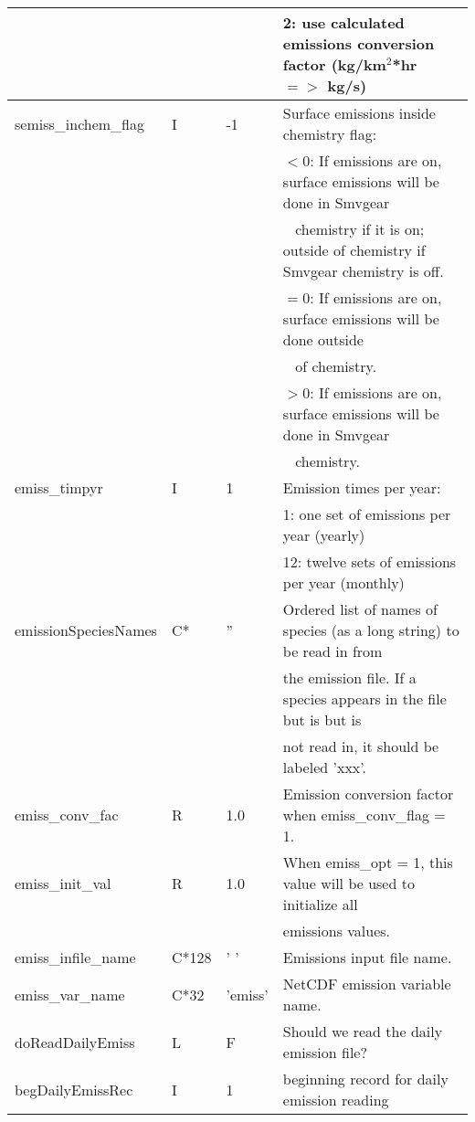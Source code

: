 {\begin{landscape}
\begin{center}
\begin{longtable}{|l|l|l|l|}
                  &   &   &         2:  use calculated emissions conversion factor (kg/km$^2$*hr $=>$ kg/s)  \\ \hline
semiss\_inchem\_flag
                & I & -1  & Surface emissions inside chemistry flag:  \\
                &   &   &   $<0$:  If emissions are on, surface emissions will be done in Smvgear \\
                  &   &   & \mbox{      } chemistry if it is on; outside of chemistry if Smvgear chemistry is off.  \\
                &   &   &   $=0$:  If emissions are on, surface emissions will be done outside \\ 
                &   &   &  \mbox{      } of chemistry.  \\
                &   &   &   $>0$:  If emissions are on, surface emissions will be done in Smvgear \\ 
                &   &   &  \mbox{      } chemistry.  \\ \hline
emiss\_timpyr    & I & 1 & Emission times per year:  \\
                 &   &   &          1:  one    set  of emissions per year (yearly)  \\
                &   &   &          12:  twelve sets of emissions per year (monthly)  \\ \hline
emissionSpeciesNames & C* & '' & Ordered list of names of species (as a long string) to be read in from \\
                     &    &    & the emission file. If a species appears in the file but is but is  \\
                 &   &   & not read in, it should be labeled 'xxx'.  \\ \hline
emiss\_conv\_fac  & R & 1.0 & Emission conversion factor when emiss\_conv\_flag = 1.  \\ \hline
emiss\_init\_val  & R & 1.0 & When emiss\_opt = 1, this value will be used to initialize all  \\
                  &   &     &  emissions values.  \\ \hline
emiss\_infile\_name     & C*128 & ' '     & Emissions input file name.  \\ \hline
emiss\_var\_name        & C*32 & 'emiss' & NetCDF emission variable name.  \\ \hline
doReadDailyEmiss  & L & F & Should we read the daily emission file? \\ \hline
begDailyEmissRec  & I & 1 & beginning record for daily emission reading \\ \hline

\end{longtable}
\end{center}
\end{landscape}}
